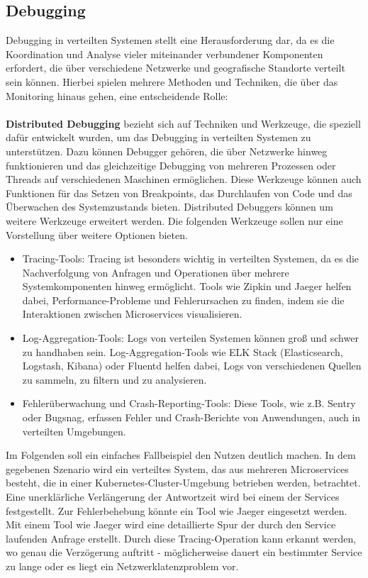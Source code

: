 \documentclass[../vs-script-first-v01.tex]{subfiles}
\begin{document}
\subsection{Debugging}

Debugging in verteilten Systemen stellt eine Herausforderung dar, da es die Koordination und Analyse vieler miteinander verbundener Komponenten erfordert, die über verschiedene Netzwerke und geografische Standorte verteilt sein können. Hierbei spielen mehrere Methoden und Techniken, die über das Monitoring hinaus gehen, eine entscheidende Rolle:
\\\\
\textbf{Distributed Debugging} bezieht sich auf Techniken und Werkzeuge, die speziell dafür entwickelt wurden, um das Debugging in verteilten Systemen zu unterstützen. Dazu können Debugger gehören, die über Netzwerke hinweg funktionieren und das gleichzeitige Debugging von mehreren Prozessen oder Threads auf verschiedenen Maschinen ermöglichen. Diese Werkzeuge können auch Funktionen für das Setzen von Breakpoints, das Durchlaufen von Code und das Überwachen des Systemzustands bieten. Distributed Debuggers können um weitere Werkzeuge erweitert werden. Die folgenden Werkzeuge sollen nur eine Vorstellung über weitere Optionen bieten.
\begin{itemize}
\item Tracing-Tools: Tracing ist besonders wichtig in verteilten Systemen, da es die Nachverfolgung von Anfragen und Operationen über mehrere Systemkomponenten hinweg ermöglicht. Tools wie Zipkin und Jaeger helfen dabei, Performance-Probleme und Fehlerursachen zu finden, indem sie die Interaktionen zwischen Microservices visualisieren.
\item Log-Aggregation-Tools: Logs von verteilen Systemen können groß und schwer zu handhaben sein. Log-Aggregation-Tools wie ELK Stack (Elasticsearch, Logstash, Kibana) oder Fluentd helfen dabei, Logs von verschiedenen Quellen zu sammeln, zu filtern und zu analysieren.
\item Fehlerüberwachung und Crash-Reporting-Tools: Diese Tools, wie z.B. Sentry oder Bugsnag, erfassen Fehler und Crash-Berichte von Anwendungen, auch in verteilten Umgebungen.
\end{itemize}
Im Folgenden soll ein einfaches Fallbeispiel den Nutzen deutlich machen. In dem gegebenen Szenario wird ein verteiltes System, das aus mehreren Microservices besteht, die in einer Kubernetes-Cluster-Umgebung betrieben werden, betrachtet. Eine unerklärliche Verlängerung der Antwortzeit wird bei einem der Services festgestellt. Zur Fehlerbehebung könnte ein Tool wie Jaeger eingesetzt werden. Mit einem Tool wie Jaeger wird eine detaillierte Spur der durch den Service laufenden Anfrage erstellt. Durch diese Tracing-Operation kann erkannt werden, wo genau die Verzögerung auftritt - möglicherweise dauert ein bestimmter Service zu lange oder es liegt ein Netzwerklatenzproblem vor.
\end{document}
